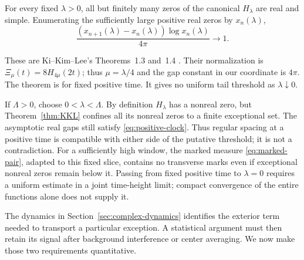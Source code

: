 \begin{theorem}\label{thm:KKL}
For every fixed \(\lambda>0\), all but finitely many zeros
of the canonical \(H_\lambda\) are real and simple. Enumerating
the sufficiently large positive real zeros by \(x_n(\lambda)\),
\begin{equation}\label{eq:positive-clock}
 \frac{(x_{n+1}(\lambda)-x_n(\lambda))\log x_n(\lambda)}{4\pi}
 \longrightarrow1.
\end{equation}
\end{theorem}
These are Ki--Kim--Lee's Theorems~1.3 and~1.4
\cite{KiKimLee2009}. Their normalization is
\(\Xi_\mu(t)=8H_{4\mu}(2t)\); thus \(\mu=\lambda/4\)
and the gap constant in our coordinate is \(4\pi\).
The theorem is for fixed positive time. It gives no uniform
tail threshold as \(\lambda\downarrow0\).

If \(\Lambda>0\), choose \(0<\lambda<\Lambda\).
By definition \(H_\lambda\) has a nonreal zero, but
Theorem~\ref{thm:KKL} confines all its nonreal zeros to a
finite exceptional set. The asymptotic real gaps still satisfy
\eqref{eq:positive-clock}. Thus regular spacing at a positive
time is compatible with either side of the putative threshold;
it is not a contradiction. For a sufficiently high window,
the marked measure \eqref{eq:marked-pair}, adapted to this
fixed slice, contains no transverse marks even if exceptional
nonreal zeros remain below it. Passing from fixed positive
time to \(\lambda=0\) requires a uniform estimate in a joint
time-height limit; compact convergence of the entire functions
alone does not supply it.

The dynamics in Section~\ref{sec:complex-dynamics} identifies the
exterior term needed to transport a particular exception. A statistical
argument must then retain its signal after background interference or
center averaging. We now make those two requirements quantitative.
